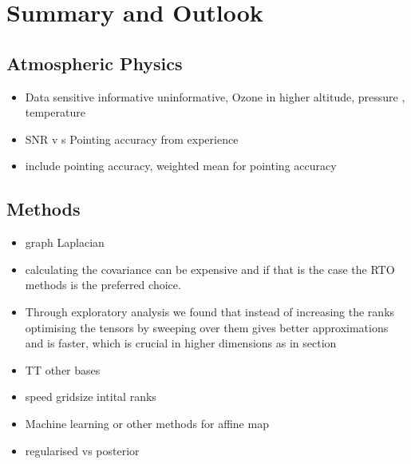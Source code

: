 \chapter{Summary and Outlook}
\label{ch:Concl}

\section{Atmospheric Physics}
\begin{itemize}
	\item Data sensitive informative uninformative, Ozone in higher altitude, pressure , temperature
	\item SNR v s Pointing accuracy from experience
	\item include pointing accuracy, weighted mean for pointing accuracy
\end{itemize}

\section{Methods}
\begin{itemize}
	\item graph Laplacian
	\item calculating the covariance can be expensive and if that is the case the RTO methods is the preferred choice.
	\item Through exploratory analysis we found that instead of increasing the ranks optimising the tensors by sweeping over them gives better approximations and is faster, which is crucial in higher dimensions as in section
	\item TT other bases
	\item speed gridsize intital ranks
	\item Machine learning or other methods for affine map
	\item regularised vs posterior
\end{itemize}